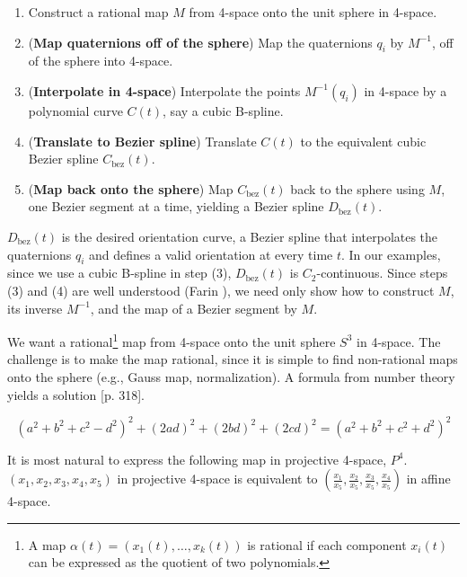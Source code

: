 \begin{enumerate}
\item
	Construct a rational map $M$ from 4-space onto the unit sphere in 
	4-space.
\item
	({\bf Map quaternions off of the sphere})
	Map the quaternions $q_i$ by $M^{-1}$,
	off of the sphere into 4-space.
\item
	({\bf Interpolate in 4-space})
	Interpolate the points $M^{-1}(q_i)$ in 4-space
	by a polynomial curve $C(t)$, say a cubic B-spline.
\item
	({\bf Translate to Bezier spline})
	Translate $C(t)$ to the equivalent cubic Bezier spline 
	$C_{\mbox{bez}}(t)$.
\item
	({\bf Map back onto the sphere})
	Map $C_{\mbox{bez}}(t)$ back to the sphere using $M$, 
	one Bezier segment at a time, yielding a  
	Bezier spline $D_{\mbox{bez}}(t)$. 
\end{enumerate}

$D_{\mbox{bez}}(t)$ is the desired orientation curve, a Bezier spline
that interpolates the quaternions $q_i$ and defines a valid orientation
at every time $t$.
In our examples, since we use a cubic B-spline in step (3),
$D_{\mbox{bez}}(t)$ is $C_2$-continuous.
Since steps (3) and (4) are well understood (Farin \cite{farin93}),
we need only show how to construct $M$, its inverse $M^{-1}$,
and the map of a Bezier segment by $M$.

We want a rational\footnote{A map $\alpha(t) = (x_1(t),\ldots,x_k(t))$
	is rational if each component $x_i(t)$ can be expressed
	as the quotient of two polynomials.}
map from 4-space onto the unit sphere $S^3$ in
4-space.
The challenge is to make the map rational,
since it is simple to find non-rational maps onto the sphere 
(e.g., Gauss map, normalization).
A formula from number theory yields a solution
\cite{dickson52}[p. 318].

\begin{lemma}
\begin{equation}
\label{eqn:aida}
(a^2 + b^2 + c^2 - d^2)^2 + (2ad)^2 + (2bd)^2 + (2cd)^2 = 
(a^2 + b^2 + c^2 + d^2)^2
\end{equation}
\end{lemma}

It is most natural to express the following map in projective 4-space, $P^4$.
$(x_1,x_2,x_3,x_4,x_5)$ in projective 4-space is equivalent to
$(\frac{x_1}{x_5},\frac{x_2}{x_5},\frac{x_3}{x_5},\frac{x_4}{x_5})$ 
in affine 4-space.

